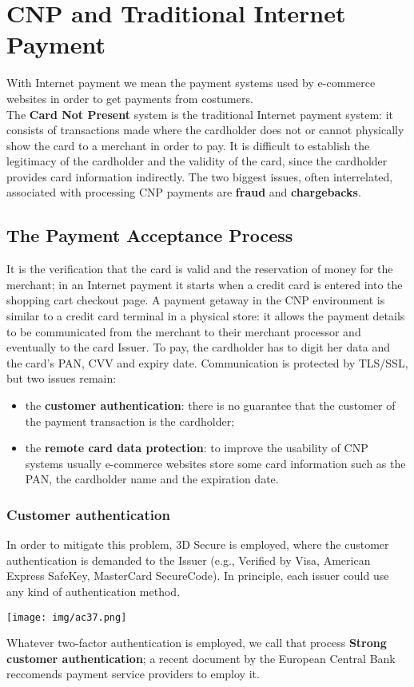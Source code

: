 \documentclass[a4paper, 10pt, titlepage]{article}
\begin{document}
\section{CNP and Traditional Internet Payment}
With Internet payment we mean the payment systems used by e-commerce websites in order to get payments from costumers. \medskip\\
The \textbf{Card Not Present} system is the traditional Internet payment system: it consists of transactions made where the cardholder does not or cannot physically show the card to a merchant in order to pay. It is difficult to establish the legitimacy of the cardholder and the validity of the card, since the cardholder provides card information indirectly. The two biggest issues, often interrelated, associated with processing CNP payments are \textbf{fraud} and \textbf{chargebacks}.

\subsection{The Payment Acceptance Process}
It is the verification that the card is valid and the reservation of money for the merchant; in an Internet payment it starts when a credit card is entered into the shopping cart checkout page. A payment getaway in the CNP environment is similar to a credit card terminal in a physical store: it allows the payment details to be communicated from the merchant to their merchant processor and eventually to the card Issuer. To pay, the cardholder has to digit her data and the card's PAN, CVV and expiry date. Communication is protected by TLS/SSL, but two issues remain:
\begin{itemize}
\item the \textbf{customer authentication}: there is no guarantee that the customer of the payment transaction is the cardholder;
\item the \textbf{remote card data protection}: to improve the usability of CNP systems usually e-commerce websites store some card information such as the PAN, the cardholder name and the expiration date.
\end{itemize}

\subsubsection*{Customer authentication}
In order to mitigate this problem, 3D Secure is employed, where the customer authentication is demanded to the Issuer (e.g., Verified by Visa, American Express SafeKey, MasterCard SecureCode). In principle, each issuer could use any kind of authentication method.
\begin{center}
\texttt{[image: img/ac37.png]}
\end{center}
Whatever two-factor authentication is employed, we call that process \textbf{Strong customer authentication}; a recent document by the European Central Bank reccomends payment service providers to employ it.
\end{document}
